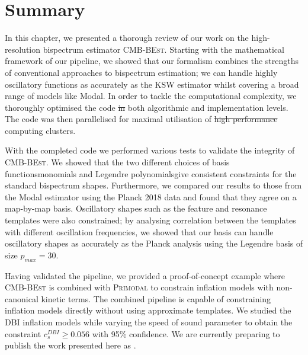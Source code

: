 \documentclass[a4paper,12pt,times,custombib,print,index]{Classes/PhDThesisPSnPDF} %
\providecommand{\DIFadd}[1]{{\protect\color{blue}\uwave{#1}}} %
\providecommand{\DIFdel}[1]{{\protect\color{red}\sout{#1}}}                      %
\providecommand{\DIFaddbegin}{} %
\providecommand{\DIFaddend}{} %
\providecommand{\DIFdelbegin}{} %
\providecommand{\DIFdelend}{} %
\newcommand{\DIFscaledelfig}{0.5}
\newlength{\DIFdelgraphicswidth} %
\newlength{\DIFdelgraphicsheight} %
\newcommand{\DIFaddincludegraphics}[2][]{{\color{blue}\fbox{\DIFOincludegraphics[#1]{#2}}}} %
\newcommand{\DIFdelincludegraphics}[2][]{%
\sbox{\DIFdelgraphicsbox}{\DIFOincludegraphics[#1]{#2}}%
\settoboxwidth{\DIFdelgraphicswidth}{\DIFdelgraphicsbox} %
\settoboxtotalheight{\DIFdelgraphicsheight}{\DIFdelgraphicsbox} %
\scalebox{\DIFscaledelfig}{%
\parbox[b]{\DIFdelgraphicswidth}{\usebox{\DIFdelgraphicsbox}\\[-\baselineskip] \rule{\DIFdelgraphicswidth}{0em}}\llap{\resizebox{\DIFdelgraphicswidth}{\DIFdelgraphicsheight}{%
\setlength{\unitlength}{\DIFdelgraphicswidth}%
\begin{picture}(1,1)%
\thicklines\linethickness{2pt} %
{\color[rgb]{1,0,0}\put(0,0){\framebox(1,1){}}}%
{\color[rgb]{1,0,0}\put(0,0){\line( 1,1){1}}}%
{\color[rgb]{1,0,0}\put(0,1){\line(1,-1){1}}}%
\end{picture}%
}\hspace*{3pt}}} %
} %
\DeclareRobustCommand{\DIFaddbegin}{\DIFOaddbegin \let\includegraphics\DIFaddincludegraphics} %
\DeclareRobustCommand{\DIFaddend}{\DIFOaddend \let\includegraphics\DIFOincludegraphics} %
\DeclareRobustCommand{\DIFdelbegin}{\DIFOdelbegin \let\includegraphics\DIFdelincludegraphics} %
\DeclareRobustCommand{\DIFdelend}{\DIFOaddend \let\includegraphics\DIFOincludegraphics} %
\begin{document}
\newpage
\section*{Summary}

In this chapter, we presented a thorough review of our work on the high-resolution bispectrum estimator \textsc{CMB-BEst}. Starting with the mathematical framework of our pipeline, we showed that our formalism combines the strengths of conventional approaches to bispectrum estimation; we can handle highly oscillatory functions as accurately as the KSW estimator whilst covering a broad range of models like Modal. In order to tackle the computational complexity, we thoroughly optimised the code \DIFdelbegin \DIFdel{in }\DIFdelend \DIFaddbegin \DIFadd{at }\DIFaddend both algorithmic and implementation levels. The code was then parallelised for maximal utilisation of \DIFdelbegin \DIFdel{high performance }\DIFdelend \DIFaddbegin \DIFadd{high-performance }\DIFaddend computing clusters.

With the completed code we performed various tests to validate the integrity of \textsc{CMB-BEst}. We showed that the two different choices of basis functions\textemdash monomials and Legendre polynomials\textemdash give consistent constraints for the standard bispectrum shapes. Furthermore, we compared our results to those from the Modal estimator using the Planck 2018 data and found that they agree on a map-by-map basis. Oscillatory shapes such as the feature and resonance templates were also constrained; by analysing \DIFaddbegin \DIFadd{the }\DIFaddend correlation between the templates with different oscillation frequencies, we showed that our basis can handle oscillatory shapes as accurately as the Planck analysis using the Legendre basis of size \DIFdelbegin \DIFdel{$p_{max}=30$}\DIFdelend \DIFaddbegin \DIFadd{$p_\text{max}=30$}\DIFaddend .

Having validated the pipeline, we provided a proof-of-concept example where \textsc{CMB-BEst} is combined with \textsc{Primodal} to constrain inflation models with non-canonical kinetic terms. The combined pipeline is capable of constraining inflation models directly without using approximate templates. We studied the DBI inflation models while varying the speed of sound parameter to obtain the constraint \DIFdelbegin \DIFdel{$c_s^{DBI} \ge 0.056$ }\DIFdelend \DIFaddbegin \DIFadd{$c_\text{s}^\text{DBI} \ge 0.056$ }\DIFaddend with 95\% confidence. We are currently preparing to publish the work presented here as \cite{Sohn2021inprep}.
\end{document}
